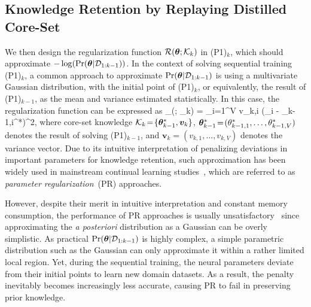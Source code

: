 \subsection{Knowledge Retention by Replaying Distilled Core-Set}\label{s2ec_know_retent}



We then design the regularization function $\mathcal R(\bm\theta; \mathcal{K}_{k})$ in (P1)$_k$, which should approximate $- \log (\operatorname{Pr}(\bm\theta|\mathcal{D}_{1:k-1}))$.
In the context of solving sequential training (P1)$_k$, a common approach to approximate $\operatorname{Pr}(\bm\theta|\mathcal{D}_{1:k-1})$ is using a multivariate Gaussian distribution, with the initial point of (P1)$_k$, or equivalently, the result of (P1)$_{k-1}$, as the mean and variance estimated statistically.
In this case, the regularization function can be expressed as
\beq
\label{equ_R_G}
\cR_{\rP}(\btheta; \cK_{k}) = \sum_{i=1}^V v_{k,i} (\theta_i - \theta_{k-1,i}^*)^2, 
\eeq
where core-set knowledge $\mathcal{K}_{k}\!=\!\{\bm\theta^*_{k-1}, \bm v_{k}\}$, $\bm\theta^*_{k-1}\!=\!(\theta^*_{k-1,1},\dots,\theta^*_{k-1,V})$ denotes the result of solving (P1)$_{k-1}$, and $\bm v_{k} \!=\!(v_{k,1},\dots,v_{k,V})$ denotes the variance vector.
Due to its intuitive interpretation of penalizing deviations in important parameters for knowledge retention, such approximation has been widely used in mainstream continual learning studies~\cite{Kirkpatrick17PNAS_Overcome, Aljundi18ECCV_Memory,Zhao24ICML_Statistical}, which are referred to as \emph{parameter regularization}~(PR) approaches. 

However, despite their merit in intuitive interpretation and constant memory consumption, the performance of PR approaches is usually unsatisfactory~\cite{Van22NatMI_Three, Delange22PAMI_Continual, Akrout23ICC_Continual} since approximating the \emph{a posteriori} distribution as a Gaussian can be overly simplistic.
As practical $\operatorname{Pr}(\bm\theta|\mathcal{D}_{1:k-1})$ is highly complex, a simple parametric distribution such as the Gaussian can only approximate it within a rather limited local region.
Yet, during the sequential training, the neural parameters deviate from their initial points to learn new domain datasets.
As a result, the penalty inevitably becomes increasingly less accurate, causing PR to fail in preserving prior knowledge.

